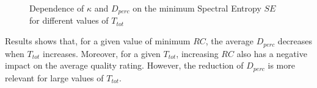 \begin{figure}[!tb]
\begin{flushright}
    \hfil
\end{flushright}
\caption{Dependence of $\kappa$ and $D_{perc}$ on the minimum Spectral Entropy $SE$ for different values of $T_{tot}$}
\label{fig:NMP:minSE}
\end{figure}


Results shows that, for a given value of minimum $RC$, the average $D_{perc}$ decreases when $T_{tot}$ increases. Moreover, for a given $T_{tot}$, increasing $RC$ also has a negative impact on the average quality rating. However, the reduction of $D_{perc}$ is more relevant for large values of $T_{tot}$. 

